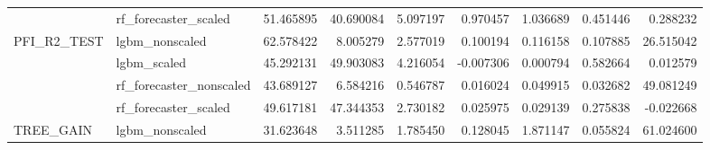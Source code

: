 \begin{table}
\begin{tabular}{llrrrrrrr}
 & rf\_forecaster\_scaled & {\cellcolor[HTML]{B40426}} \color[HTML]{F1F1F1} 51.465895 & {\cellcolor[HTML]{EF886B}} \color[HTML]{F1F1F1} 40.690084 & {\cellcolor[HTML]{5875E1}} \color[HTML]{F1F1F1} 5.097197 & {\cellcolor[HTML]{3E51C5}} \color[HTML]{F1F1F1} 0.970457 & {\cellcolor[HTML]{3E51C5}} \color[HTML]{F1F1F1} 1.036689 & {\cellcolor[HTML]{3B4CC0}} \color[HTML]{F1F1F1} 0.451446 & {\cellcolor[HTML]{3B4CC0}} \color[HTML]{F1F1F1} 0.288232 \\
\cline{1-9}
\multirow[c]{4}{*}{PFI\_R2\_TEST} & lgbm\_nonscaled & {\cellcolor[HTML]{B40426}} \color[HTML]{F1F1F1} 62.578422 & {\cellcolor[HTML]{6282EA}} \color[HTML]{F1F1F1} 8.005279 & {\cellcolor[HTML]{465ECF}} \color[HTML]{F1F1F1} 2.577019 & {\cellcolor[HTML]{3B4CC0}} \color[HTML]{F1F1F1} 0.100194 & {\cellcolor[HTML]{3B4CC0}} \color[HTML]{F1F1F1} 0.116158 & {\cellcolor[HTML]{3B4CC0}} \color[HTML]{F1F1F1} 0.107885 & {\cellcolor[HTML]{C7D7F0}} \color[HTML]{000000} 26.515042 \\
 & lgbm\_scaled & {\cellcolor[HTML]{D44E41}} \color[HTML]{F1F1F1} 45.292131 & {\cellcolor[HTML]{B40426}} \color[HTML]{F1F1F1} 49.903083 & {\cellcolor[HTML]{5470DE}} \color[HTML]{F1F1F1} 4.216054 & {\cellcolor[HTML]{3B4CC0}} \color[HTML]{F1F1F1} -0.007306 & {\cellcolor[HTML]{3B4CC0}} \color[HTML]{F1F1F1} 0.000794 & {\cellcolor[HTML]{3E51C5}} \color[HTML]{F1F1F1} 0.582664 & {\cellcolor[HTML]{3B4CC0}} \color[HTML]{F1F1F1} 0.012579 \\
 & rf\_forecaster\_nonscaled & {\cellcolor[HTML]{D95847}} \color[HTML]{F1F1F1} 43.689127 & {\cellcolor[HTML]{6485EC}} \color[HTML]{F1F1F1} 6.584216 & {\cellcolor[HTML]{3D50C3}} \color[HTML]{F1F1F1} 0.546787 & {\cellcolor[HTML]{3B4CC0}} \color[HTML]{F1F1F1} 0.016024 & {\cellcolor[HTML]{3B4CC0}} \color[HTML]{F1F1F1} 0.049915 & {\cellcolor[HTML]{3B4CC0}} \color[HTML]{F1F1F1} 0.032682 & {\cellcolor[HTML]{B40426}} \color[HTML]{F1F1F1} 49.081249 \\
 & rf\_forecaster\_scaled & {\cellcolor[HTML]{B40426}} \color[HTML]{F1F1F1} 49.617181 & {\cellcolor[HTML]{C43032}} \color[HTML]{F1F1F1} 47.344353 & {\cellcolor[HTML]{4B64D5}} \color[HTML]{F1F1F1} 2.730182 & {\cellcolor[HTML]{3B4CC0}} \color[HTML]{F1F1F1} 0.025975 & {\cellcolor[HTML]{3B4CC0}} \color[HTML]{F1F1F1} 0.029139 & {\cellcolor[HTML]{3C4EC2}} \color[HTML]{F1F1F1} 0.275838 & {\cellcolor[HTML]{3B4CC0}} \color[HTML]{F1F1F1} -0.022668 \\
\cline{1-9}
\multirow[c]{4}{*}{TREE\_GAIN} & lgbm\_nonscaled & {\cellcolor[HTML]{E1DAD6}} \color[HTML]{000000} 31.623648 & {\cellcolor[HTML]{4B64D5}} \color[HTML]{F1F1F1} 3.511285 & {\cellcolor[HTML]{4358CB}} \color[HTML]{F1F1F1} 1.785450 & {\cellcolor[HTML]{3B4CC0}} \color[HTML]{F1F1F1} 0.128045 & {\cellcolor[HTML]{4358CB}} \color[HTML]{F1F1F1} 1.871147 & {\cellcolor[HTML]{3B4CC0}} \color[HTML]{F1F1F1} 0.055824 & {\cellcolor[HTML]{B40426}} \color[HTML]{F1F1F1} 61.024600 \\

\end{tabular}
\end{table}
